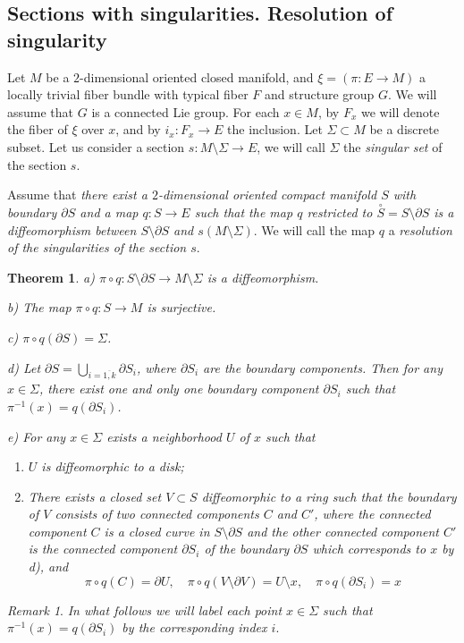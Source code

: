 \documentclass[12pt,letterpaper]{amsart}
\theoremstyle{definition}
\theoremstyle{plain}
\newtheorem{thm}{Theorem}
\theoremstyle{remark}
\newtheorem{rem}{Remark}
\begin{document}
\subsection{Sections with singularities. Resolution of singularity}
\label{subsec:2_1}

Let $M$ be a $2$-dimensional oriented closed manifold, and $\xi = (\pi : E \to M)$ a locally trivial fiber bundle with typical fiber $F$ and structure group $G$.
We will assume that $G$ is a connected Lie group.
For each $x \in M$, by $F_x$ we will denote the fiber of $\xi$ over $x$, and by $i_x : F_x \to E$ the inclusion.
Let $\Sigma \subset M$ be a discrete subset.
Let us consider a section $s : M \setminus \Sigma \to E$, we will call $\Sigma$ the \emph{singular set} of the section $s$.

Assume that \emph{there exist a $2$-dimensional oriented compact manifold $S$ with boundary $\partial S$ and a map $q : S \to E$ such that
the map $q$ restricted to $\overset{\circ}{S} = S \setminus \partial S$ is a diffeomorphism between $S \setminus \partial S$ and $s(M \setminus \Sigma)$}.
We will call the map $q$ a \emph{resolution of the singularities of the section $s$}.



\begin{thm}
\emph{a)} $\pi \circ q : S \setminus \partial S \to M \setminus \Sigma$ is a diffeomorphism.

\emph{b)} The map $\pi \circ q : S \to M$ is surjective.

\emph{c)} $\pi \circ q(\partial S) = \Sigma$.

\emph{d)} Let $\partial S = \bigcup\limits_{i = \overline{1, k}} \partial S_i$, where $\partial S_i$ are the boundary components.
Then for any $x \in \Sigma$, there exist one and only one boundary component $\partial S_i$ such that $\pi^{-1}(x) = q(\partial S_i)$.

\emph{e)} For any $x \in \Sigma$ exists a neighborhood $U$ of $x$ such that
\begin{enumerate}
\item
$U$ is diffeomorphic to a disk;
\item
There exists a closed set $V \subset S$ diffeomorphic to a ring such that the boundary of $V$ consists of two connected components $C$ and $C'$, where the connected component $C$ is a closed curve in $S \setminus \partial S$ and the other connected component $C'$ is the connected component $\partial S_i$ of the boundary $\partial S$ which corresponds to $x$ by d), and
\begin{equation}
\pi \circ q(C) = \partial U, \quad \pi \circ q(V \setminus \partial V) = U \setminus x, \quad \pi \circ q(\partial S_i) = x
\label{eq:4}
\end{equation}
\end{enumerate}

\label{thm:1}
\end{thm}
\begin{rem}
\emph{In what follows we will label each point $x \in \Sigma$ such that $\pi^{-1}(x) = q(\partial S_i)$ by the corresponding index $i$}.
\label{rem:1}
\end{rem}
\end{document}
